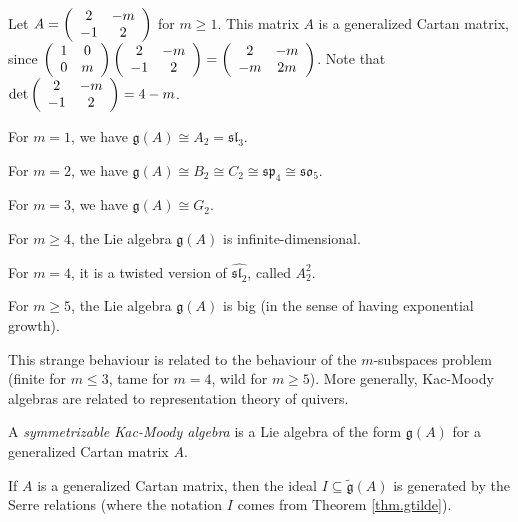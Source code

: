 \documentclass[etingof-lie.tex]{subfiles}
\begin{document}
\begin{example}
Let $A=\left(
\begin{array}
[c]{cc}%
2 & -m\\
-1 & 2
\end{array}
\right)  $ for $m\geq1$. This matrix $A$ is a generalized Cartan matrix, since
$\left(
\begin{array}
[c]{cc}%
1 & 0\\
0 & m
\end{array}
\right)  \left(
\begin{array}
[c]{cc}%
2 & -m\\
-1 & 2
\end{array}
\right)  =\left(
\begin{array}
[c]{cc}%
2 & -m\\
-m & 2m
\end{array}
\right)  $. Note that $\det\left(
\begin{array}
[c]{cc}%
2 & -m\\
-1 & 2
\end{array}
\right)  =4-m$.

For $m=1$, we have $\mathfrak{g}\left(  A\right)  \cong A_{2}=\mathfrak{sl}%
_{3}$.

For $m=2$, we have $\mathfrak{g}\left(  A\right)  \cong B_{2}\cong C_{2}%
\cong\mathfrak{sp}_{4}\cong\mathfrak{so}_{5}$.

For $m=3$, we have $\mathfrak{g}\left(  A\right)  \cong G_{2}$.

For $m\geq4$, the Lie algebra $\mathfrak{g}\left(  A\right)  $ is infinite-dimensional.

For $m=4$, it is a twisted version of $\widehat{\mathfrak{sl}_{2}}$, called
$A_{2}^{2}$.

For $m\geq5$, the Lie algebra $\mathfrak{g}\left(  A\right)  $ is big (in the
sense of having exponential growth).

This strange behaviour is related to the behaviour of the $m$-subspaces
problem (finite for $m\leq3$, tame for $m=4$, wild for $m\geq5$). More
generally, Kac-Moody algebras are related to representation theory of quivers.
\end{example}

\begin{definition}
A \textit{symmetrizable Kac-Moody algebra} is a Lie algebra of the form
$\mathfrak{g}\left(  A\right)  $ for a generalized Cartan matrix $A$.
\end{definition}

\begin{theorem}
\label{thm.g(A).gabber-kac}If $A$ is a generalized Cartan matrix,
then the ideal $I\subseteq\widetilde{\mathfrak{g}}\left(  A\right)  $ is
generated by the Serre relations (where the notation $I$ comes from Theorem
\ref{thm.gtilde}).
\end{theorem}
\end{document}

